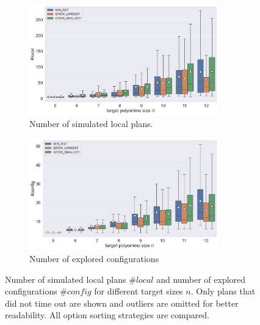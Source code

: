 \begin{figure}
	\centering
	\begin{subfigure}[b]{\textwidth}
		\centering
		\includegraphics[width=0.9\textwidth]{figures/plots/AFN_nlocal.pdf}
		\caption{Number of simulated local plans.}
		\label{fig:AFN_nlocal}
	\end{subfigure}
	
	\begin{subfigure}[b]{\textwidth}
		\centering
		\includegraphics[width=0.9\textwidth]{figures/plots/AFN_nconfig.pdf}
		\caption{Number of explored configurations}
		\label{fig:AFN_nconfig}
	\end{subfigure}
	\caption[$\#\textit{local}$ and $\#\textit{config}$ for different target sizes]{Number of simulated local plans $\#\textit{local}$ and number of explored configurations $\#\textit{config}$ for different target sizes $n$. Only plans that did not time out are shown and outliers are omitted for better readability. All option sorting strategies are compared.}
	\label{fig:AFN_planstats}
\end{figure}

